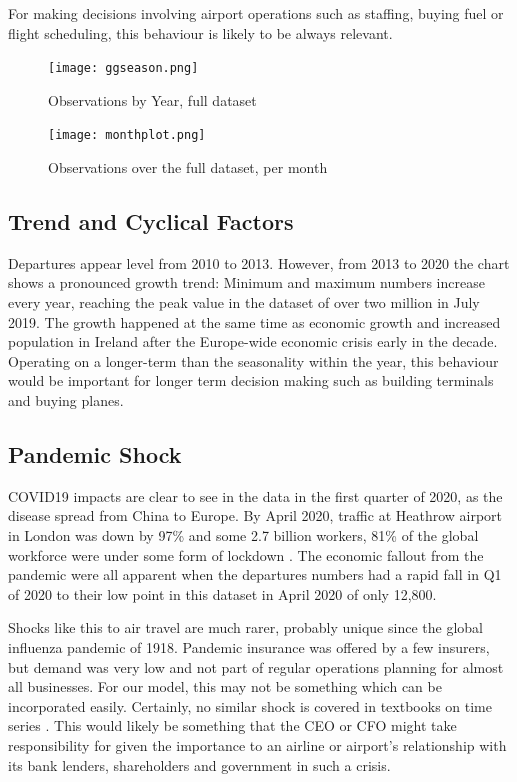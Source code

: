 \documentclass[9pt,technote]{IEEEtran}
\begin{document}
For making decisions involving airport operations such as staffing, buying fuel or flight scheduling, this behaviour is likely to be always relevant.  

\begin{figure}[htbp]
\centerline{\texttt{[image: ggseason.png]}}
\caption{Observations by Year, full dataset}
\label{fig:ggseason}
\end{figure}

\begin{figure}[htbp]
\centerline{\texttt{[image: monthplot.png]}}
\caption{Observations over the full dataset, per month}
\label{fig:monthplot}
\end{figure}

\subsection{Trend and Cyclical Factors} Departures appear level from 2010 to 2013.  However, from 2013 to 2020 the chart shows a pronounced growth trend: Minimum and maximum numbers increase every year, reaching the peak value in the dataset of over two million in July 2019.  The growth happened at the same time as economic growth and increased population in Ireland after the Europe-wide economic crisis early in the decade.  Operating on a longer-term than the seasonality within the year, this behaviour would be important for longer term decision making such as building terminals and buying planes.  

\subsection{Pandemic Shock}

COVID19 impacts are clear to see in the data in the first quarter of 2020, as the disease spread from China to Europe.  By April 2020, traffic at Heathrow airport in London was down by 97\% and some 2.7 billion workers, 81\% of the global workforce were under some form of lockdown \cite{tooze21}.  The economic fallout from the pandemic were all apparent when the departures numbers had a rapid fall in Q1 of 2020 to their low point in this dataset in April 2020 of only 12,800.  

Shocks like this to air travel are much rarer, probably unique since the global influenza pandemic of 1918.  Pandemic insurance was offered by a few insurers, but demand was very low and not part of regular operations planning for almost all businesses\cite{ratliff20}. For our model, this may not be something which can be incorporated easily. Certainly, no similar shock is covered in textbooks on time series \cite{fpp2}.  This would likely be something that the CEO or CFO might take responsibility for given the importance to an airline or airport's relationship with its bank lenders, shareholders and government in such a crisis.  
\end{document}
